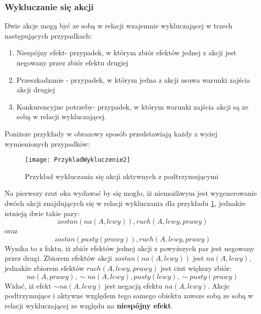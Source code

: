     \subsubsection{Wykluczanie się akcji}
    Dwie akcje mogą być ze sobą w relacji wzajemnie wykluczającej w trzech następujących przypadkach:
    \begin{enumerate}
        \item Niespójny efekt- przypadek, w którym zbiór efektów jednej z akcji 
        jest negowany przez zbiór efektu drugiej
        \item Przeszkadzanie - przypadek, w którym jedna z akcji usuwa warunki 
        zajścia akcji drugiej 
        \item Konkurencyjne potrzeby- przypadek, w którym warunki zajścia akcji 
        są ze sobą w relacji wykluczającej.
    \end{enumerate}
    Poniższe przykłady w obrazowy sposób przedstawiają każdy z wyżej wymienionych
    przypadków:

    \begin{figure}[H]
        \texttt{[image: PrzykladWykluczenie2]}
        \centering
        \caption{Przykład wykluczania się akcji aktywnych z podtrzymującymi}
        \label{PrzykladWykluczenie2}
    \end{figure}

    Na pierwszy rzut oka wydawać by się mogło, iż niemożliwym jest wygenerowanie dwóch akcji znajdujących się w relacji wykluczania dla przykładu 
    \ref{PrzykladWykluczenie2}, jednakże istnieją dwie takie pary: 
    \begin{equation}
        zostan(na(A,lewy)),ruch(A,lewy,prawy)
    \end{equation} 
    oraz 
    \begin{equation}
        zostan(pusty(prawy)),ruch(A,lewy,prawy)
    \end{equation} 
    Wynika to z faktu, iż zbiór efektów jednej akcji z powyższych par jest negowany przez drugi. Zbiorem efektów akcji 
    $zostan(na(A,lewy))$ jest $na(A,lewy)$, jednakże zbiorem efektów $ruch(A,lewy,prawy)$ jest ciut większy zbiór:
    \begin{equation}
        na(A,prawy), \sim na(A,lewy), pusty(lewy), \sim pusty(prawy)
    \end{equation}
    Widać, iż efekt $\sim na(A,lewy)$ jest negacją efektu $na(A,lewy)$. Akcje podtrzymujące i aktywne względem tego samego obiektu zawsze sobą ze sobą 
    w relacji wykluczającej ze względu na \textbf{niespójny efekt}.

